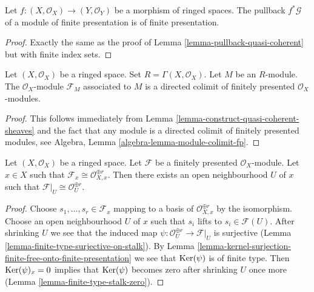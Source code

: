 \begin{lemma}
\label{lemma-pullback-finite-presentation}
Let $f : (X, \mathcal{O}_X) \to (Y, \mathcal{O}_Y)$
be a morphism of ringed spaces.
The pullback $f^*\mathcal{G}$ of a module of finite presentation
is of finite presentation.
\end{lemma}

\begin{proof}
Exactly the same as the proof of Lemma \ref{lemma-pullback-quasi-coherent}
but with finite index sets.
\end{proof}

\begin{lemma}
\label{lemma-quasi-coherent-limit-finite-presentation}
Let $(X, \mathcal{O}_X)$ be a ringed space.
Set $R = \Gamma(X, \mathcal{O}_X)$.
Let $M$ be an $R$-module.
The $\mathcal{O}_X$-module $\mathcal{F}_M$ associated to $M$
is a directed colimit of finitely presented $\mathcal{O}_X$-modules.
\end{lemma}

\begin{proof}
This follows immediately from
Lemma \ref{lemma-construct-quasi-coherent-sheaves}
and the fact that any module is a directed colimit
of finitely presented modules, see
Algebra, Lemma \ref{algebra-lemma-module-colimit-fp}.
\end{proof}

\begin{lemma}
\label{lemma-finite-presentation-stalk-free}
Let $(X, \mathcal{O}_X)$ be a ringed space. Let $\mathcal{F}$ be
a finitely presented $\mathcal{O}_X$-module. Let $x \in X$ such that
$\mathcal{F}_x \cong \mathcal{O}_{X, x}^{\oplus r}$. Then there exists
an open neighbourhood $U$ of $x$ such that
$\mathcal{F}|_U \cong \mathcal{O}_U^{\oplus r}$.
\end{lemma}

\begin{proof}
Choose $s_1, \ldots, s_r \in \mathcal{F}_x$ mapping to a basis of
$\mathcal{O}_{X, x}^{\oplus r}$ by the isomorphism. Choose an open
neighbourhood $U$ of $x$ such that $s_i$ lifts to $s_i \in \mathcal{F}(U)$.
After shrinking $U$ we see that the induced map
$\psi : \mathcal{O}_U^{\oplus r} \to \mathcal{F}|_U$ is surjective
(Lemma \ref{lemma-finite-type-surjective-on-stalk}).
By Lemma \ref{lemma-kernel-surjection-finite-free-onto-finite-presentation}
we see that $\mathop{\mathrm{Ker}}(\psi)$ is of finite type.
Then $\mathop{\mathrm{Ker}}(\psi)_x = 0$ implies that $\mathop{\mathrm{Ker}}(\psi)$ becomes zero
after shrinking $U$ once more (Lemma \ref{lemma-finite-type-stalk-zero}).
\end{proof}





